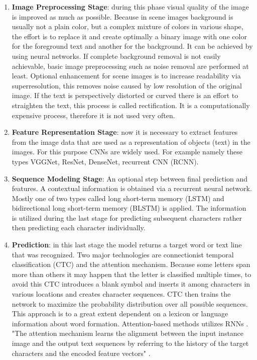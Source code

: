 \begin{enumerate}
    \item \textbf{Image Preprocessing Stage}: during this phase visual quality of the image is improved as much as possible. Because in scene images background is usually not a plain color, but a complex mixture of colors in various shape, the effort is to replace it and create optimally a binary image with one color for the foreground text and another for the background. It can be achieved by using neural networks. If complete background removal is not easily achievable, basic image preprocessing such as noise removal are performed at least. Optional enhancement for scene images is to increase readability via superresolution, this removes noise caused by low resolution of the original image. If the text is perspectively distorted or curved there is an effort to straighten the text, this process is called rectification. It is a computationally expensive process, therefore it is not used very often.\cite{chen2021text}
    \item \textbf{Feature Representation Stage}: now it is necessary to extract features from the image data that are used as a representation of objects (text) in the images. For this purpose CNNs are widely used. For example namely these types VGGNet, ResNet, DenseNet, recurrent CNN (RCNN).
    \item \textbf{Sequence Modeling Stage}: An optional step between final prediction and features. A contextual information is obtained via a recurrent neural network. Mostly one of two types called long short-term memory (LSTM) and bidirectional long short-term memory (BLSTM) is applied. The information is utilized  during the last stage for predicting subsequent characters rather then predicting each character individually. 
    \item \textbf{Prediction}: in this last stage the model returns a target word or text line that was recognized. Two major technologies are connectionist temporal classification (CTC) and the attention mechanism. 
    Because some letters span more than others it may happen that the letter is classified multiple times, to avoid this CTC introduces a blank symbol and inserts it among characters in various locations and creates character sequences. CTC then trains the network to maximize the probability distribution over all possible sequences. This approach is to a great extent dependent on a lexicon or language information about word formation. Attention-based methods utilizes RNNs \cite{ctc}. "The attention mechanism learns the alignment between the input instance image
    and the output text sequences by referring to the history of the target characters and the encoded
    feature vectors" \cite[page 12]{chen2021text}.
\end{enumerate}



